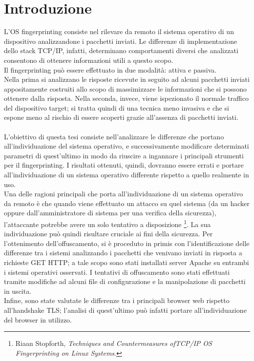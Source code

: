

\chapter{Introduzione}
\label{introduzione}

L'OS fingerprinting consiste nel rilevare da remoto il sistema operativo di un dispositivo analizzandone i pacchetti inviati. Le differenze di implementazione dello stack TCP/IP, infatti, determinano comportamenti diversi che analizzati consentono di ottenere informazioni utili a questo scopo. \\
Il fingerprinting può essere effettuato in due modalità: attiva e passiva. \\ 
Nella prima si analizzano le risposte ricevute in seguito ad alcuni pacchetti inviati appositamente costruiti allo scopo di massimizzare le informazioni che si possono ottenere dalla risposta.
Nella seconda, invece, viene ispezionato il normale traffico del dispositivo target; si tratta quindi di una tecnica meno invasiva e che si espone meno al rischio di essere scoperti grazie all'assenza di pacchetti inviati.
\\
\\
L'obiettivo di questa tesi consiste nell'analizzare le differenze che portano all'individuazione del sistema operativo, e successivamente modificare determinati parametri di quest'ultimo in modo da riuscire a ingannare i principali strumenti per il fingerprinting.
I risultati ottenuti, quindi, dovranno essere errati e portare all'individuazione di un sistema operativo differente rispetto a quello realmente in uso.\\
Una delle ragioni principali che porta all'individuazione di un sistema operativo da remoto è che quando viene effettuato un attacco su quel sistema (da un hacker oppure dall'amministratore di sistema per una verifica della sicurezza), l'attaccante potrebbe avere un solo tentativo a disposizione \footnote{Riaan Stopforth,\textit{ Techniques and Countermeasures ofTCP/IP OS Fingerprinting on Linux Systems}.}. La sua individuazione può quindi risultare cruciale ai fini della sicurezza.
Per l'ottenimento dell'offuscamento, si è proceduto in primis con l'identificazione delle differenze tra i sistemi analizzando i pacchetti che venivano inviati in risposta a richieste GET HTTP; a tale scopo sono stati installati server Apache su entrambi i sistemi operativi osservati. I tentativi di offuscamento sono stati effettuati tramite modifiche ad alcuni file di configurazione e la manipolazione di pacchetti in uscita.
\\
Infine, sono state valutate le differenze tra i principali browser web rispetto all'handshake TLS; l'analisi di quest'ultimo può infatti portare all'individuazione del browser in utilizzo.










